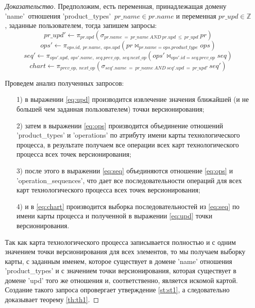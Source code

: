 \begin{proof}[Доказательство]
	\indent Предположим, есть переменная, принадлежащая домену 'name'\ отношения 'product\_types'\ $pr\_name \in pr.name$ и переменная $pr\_upd \in \mathbb{Z}$, заданные пользователем, тогда запишем запросы:
	\begin{equation}
		\label{eq:upd}
		pr\_upd' \leftarrow \pi_{pr.upd}(\sigma_{pr.name\ =\ pr\_name\ AND\ pr.upd\ \leq\ pr\_upd}\ pr)
	\end{equation}
	\begin{equation}
		\label{eq:ops}
		ops' \leftarrow \pi_{ops.id,\ pr.name,\ ops.upd}(pr \bowtie_{pr.name = ops.product\_type} ops)
	\end{equation}
	\begin{equation}
		\label{eq:seq}
		seq' \leftarrow \pi_{ops'.upd,\ ops'.name,\ seq.prev\_op,\ seq.next\_op}(ops' \bowtie_{ops'.id = seq.prev\_op} seq)
	\end{equation}
	\begin{equation}
		\label{eq:chart}
		chart \leftarrow \pi_{prev\_op,\ next\_op} (\sigma_{seq'.name\ =\ pr\_name\ AND\ seq'.upd\ =\ pr\_upd'\ } seq')
	\end{equation}

	\indent Проведем анализ полученных запросов:
	\begin{enumerate}
		\item[1)] в выражении \ref{eq:upd} производится извлечение значения ближайшей (и не большей чем заданная пользователем) точки версионирования;
		\item[2)] затем в выражении \ref{eq:ops} производится объединение отношений 'product\_types' и 'operations' по атрибуту имени карты технологического процесса, в результате получаем все операции всех карт технологического процесса всех точек версионирования;
		\item[3)] после этого в выражении \ref{eq:seq} объединяются отношение \ref{eq:ops} и 'operation\_sequences', что дает все последовательности операций для всех карт технологического процесса всех точек версионирования;
		\item[4)] и в \ref{eq:chart} производится выборка последовательностей из \ref{eq:seq} по имени карты процесса и полученной в выражении \ref{eq:upd} точки версионирования.
	\end{enumerate}

	\indent Так как карта технологического процесса записывается полностью и с одним значением точки версионирования для всех элементов, то мы получаем выборку карты, с заданным именем, которое существует в домене 'name' отношения 'product\_types' и с значением точки версионирования, которая существует в домене 'upd' того же отношения и, соответственно, является искомой картой.
	Создание такого запроса опровергает утверждение \ref{st:st1}, а следовательно доказывает теорему \ref{th:th1}.
\end{proof}